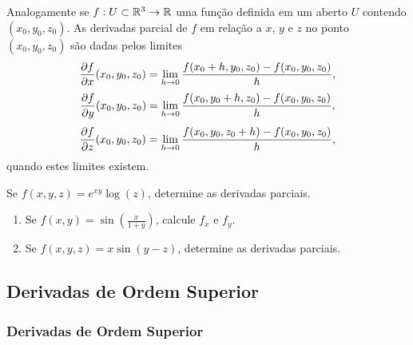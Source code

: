 \begin{frame}[label=der-parciais]
	\frametitle{ }
	Analogamente se $f:U\subset\mathbb{R}^3\to \mathbb{R}$ uma função definida em um aberto $U$ contendo $(x_0,y_0,z_0)$. As derivadas parcial de $f$ em relação a $x$, $y$ e $z$  no ponto $(x_0,y_0,z_0)$ são dadas pelos limites
\[\frac{\partial f}{\partial x}(x_0,y_0,z_0)=\lim_{h\to 0}\frac{f(x_0+h,y_0,z_0)-f(x_0,y_0,z_0)}{h},\]
\[\frac{\partial f}{\partial y}(x_0,y_0,z_0)=\lim_{h\to 0}\frac{f(x_0,y_0+h,z_0)-f(x_0,y_0,z_0)}{h},\]
\[\frac{\partial f}{\partial z}(x_0,y_0,z_0)=\lim_{h\to 0}\frac{f(x_0,y_0,z_0+h)-f(x_0,y_0,z_0)}{h},\]
	quando estes limites existem. 
	
\begin{exe}
Se $f(x,y,z)=e^{xy}\log(z)$, determine as derivadas parciais.
\end{exe}
	
\end{frame}


\begin{frame}[label=der-parciais]
\begin{casa}
\begin{enumerate}
\item Se $f(x,y)=\sin\left(\frac{x}{1+y}\right)$, calcule $f_x$ e $f_y$.

\item Se $f(x,y,z)=x\sin(y-z)$, determine as derivadas parciais.
\end{enumerate}
\end{casa}
\end{frame}



\subsection*{Derivadas de Ordem Superior}
\begin{frame}[label=der-parciais]
	\frametitle{Derivadas de Ordem Superior }
		
		
		
		
\end{frame}




